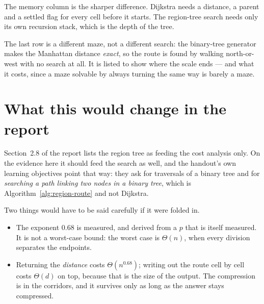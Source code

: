 \documentclass[11pt,a4paper]{article}
\begin{document}
The memory column is the sharper difference. Dijkstra needs a distance, a parent
and a settled flag for every cell before it starts. The region-tree search needs
only its own recursion stack, which is the depth of the tree.

The last row is a different maze, not a different search: the binary-tree
generator makes the Manhattan distance \emph{exact}, so the route is found by
walking north-or-west with no search at all. It is listed to show where the
scale ends --- and what it costs, since a maze solvable by always turning the
same way is barely a maze.

\section{What this would change in the report}

Section~2.8 of the report lists the region tree as feeding the cost analysis
only. On the evidence here it should feed the search as well, and the handout's
own learning objectives point that way: they ask for traversals of a binary tree
and for \emph{searching a path linking two nodes in a binary tree}, which is
Algorithm~\ref{alg:region-route} and not Dijkstra.

Two things would have to be said carefully if it were folded in.

\begin{itemize}[leftmargin=*,itemsep=3pt]
  \item The exponent $0.68$ is measured, and derived from a $p$ that is itself
        measured. It is not a worst-case bound: the worst case is
        $\Theta(n)$, when every division separates the endpoints.
  \item Returning the \emph{distance} costs $\Theta(n^{0.68})$; writing out the
        route cell by cell costs $\Theta(d)$ on top, because that is the size of
        the output. The compression is in the corridors, and it survives only as
        long as the answer stays compressed.
\end{itemize}
\end{document}
